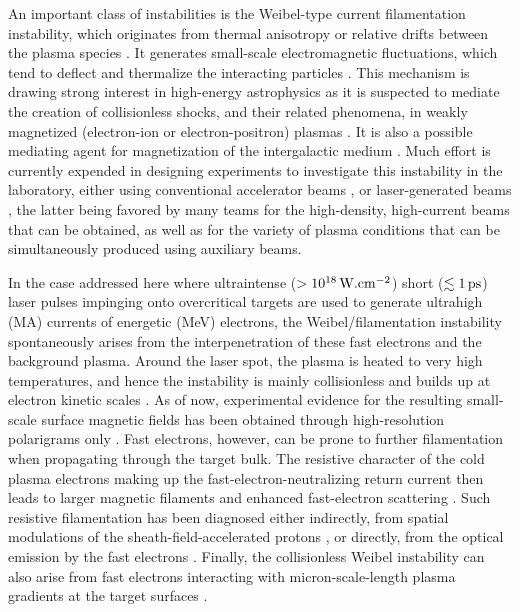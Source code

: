 \documentclass[aps,twocolumn,showpacs,superscriptaddress]{revtex4}
\begin{document}
An important class of instabilities is the Weibel-type current filamentation instability, which originates from thermal anisotropy \cite{PRL_Weibel_1959} or relative drifts between the plasma species \cite{POF_Fried_1959}. It generates small-scale electromagnetic fluctuations, which tend to deflect and thermalize the interacting particles \cite{POF_Davidson_1972, PRL_Lee_1973, POP_Silva_2002, APJ_Jaroschek_2004, PRL_Adam_2006}. This mechanism is drawing strong interest in high-energy astrophysics as it is suspected to mediate the creation of collisionless shocks, and their related phenomena, in weakly magnetized (electron-ion or electron-positron) plasmas \cite{APJ_Medvedev_1999, RPP_Marcowith_2016}. It is also a possible mediating agent for magnetization of the intergalactic medium \cite{APJ_Schlickeiser_2003}.
%
Much effort is currently expended in designing experiments to investigate this instability in the laboratory, either using conventional accelerator beams \cite{PRL_Allen_2012}, or laser-generated beams \cite{PRL_Fox_2013,NP_Huntington_2015},
the latter being favored by many teams for the high-density, high-current beams that can be obtained, as well as for the variety of plasma conditions that can be simultaneously produced using auxiliary beams. 

In the case addressed here where ultraintense ($>10^{18}\,\rm W.cm^{-2}$) short ($\lesssim 1\,\rm ps$) laser pulses impinging onto overcritical targets are used to generate ultrahigh (MA) currents of energetic (MeV) electrons, the Weibel/filamentation instability spontaneously arises from the interpenetration of these fast electrons and the background plasma. Around the laser spot, the plasma is heated to very high temperatures, and hence the instability is mainly collisionless and builds up at electron kinetic scales \cite{PRL_Adam_2006}. As of now, experimental evidence for the resulting small-scale surface magnetic fields has been obtained through high-resolution polarigrams only \cite{PNAS_Mondal_2012}. Fast electrons, however, can be prone to further filamentation when propagating through the target bulk. The resistive character of the cold plasma electrons making up the fast-electron-neutralizing return current \cite{POP_Gremillet_2002} then leads to larger magnetic filaments \cite{JPP_Fiore_2010} and enhanced fast-electron scattering \cite{POP_Yang_2016}. 
Such resistive filamentation has been diagnosed either indirectly, from spatial modulations of the sheath-field-accelerated protons \cite{PRL_Fuchs_2003, PRL_McKenna_2011, PRL_MacLellan_2013}, or directly,
from the optical emission by the fast electrons  \cite{PRL_Jung_2005, PRL_Storm_2009}.
Finally, the collisionless Weibel instability can also arise from fast electrons interacting with micron-scale-length plasma gradients at the target surfaces \cite{PRE_Wei_2004, PRL_Gode_2017, NJP_Scott_2017}.
\end{document}

